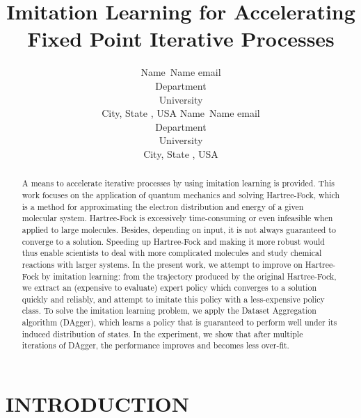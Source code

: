 \documentclass[twoside,11pt]{article}
\begin{document}
\title{Imitation Learning for Accelerating Fixed Point Iterative Processes}

\author{\name Name\ Name \email email \\
       \addr Department\\
       University \\
       City, State , USA
       \AND
       \name Name\ Name \email email \\
       \addr Department\\
       University \\
       City, State , USA}

\maketitle


\begin{abstract}
A means to accelerate iterative processes by using imitation learning is provided. This work focuses on the application of quantum mechanics and solving Hartree-Fock, which is a method for approximating the electron distribution and energy of a given molecular system. Hartree-Fock is excessively time-consuming or even infeasible when applied to large molecules. Besides, depending on input, it is not always guaranteed to converge to a solution. Speeding up Hartree-Fock and making it more robust would thus enable scientists to deal with more complicated molecules and study chemical reactions with larger systems. In the present work, we attempt to improve on Hartree-Fock by imitation learning: from the trajectory produced by the original Hartree-Fock, we extract an (expensive to evaluate) expert policy which converges to a solution quickly and reliably, and attempt to imitate this policy with a less-expensive policy class.  To solve the imitation learning problem, we apply the Dataset Aggregation algorithm (DAgger), which learns a policy that is guaranteed to perform well under its induced distribution of states. In the experiment, we show that after 
 multiple iterations of DAgger, the performance improves and becomes less over-fit. 
\end{abstract}

\section{INTRODUCTION}
\end{document}
